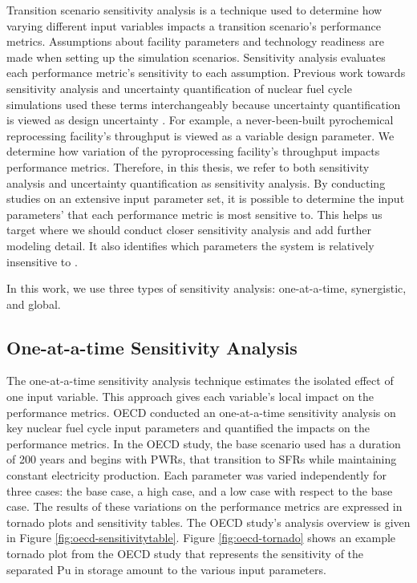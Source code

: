 Transition scenario sensitivity analysis is a technique used to determine how varying
different input variables impacts a transition scenario's performance metrics.
Assumptions about facility parameters and technology readiness 
are made when setting up the simulation scenarios. 
Sensitivity analysis evaluates each performance metric's 
sensitivity to each assumption. 
Previous work towards sensitivity analysis and uncertainty quantification of 
nuclear fuel cycle simulations used these terms interchangeably
because uncertainty quantification is viewed as design uncertainty \cite{noauthor_effects_2017}.
For example, a never-been-built pyrochemical reprocessing 
facility's throughput is viewed as a variable design parameter.
We determine how variation of the pyroprocessing 
facility's throughput impacts performance metrics.
Therefore, in this thesis, we refer to both sensitivity analysis 
and uncertainty quantification as sensitivity analysis. 
By conducting studies on an extensive input parameter set, 
it is possible to determine the input parameters' that each performance 
metric is most sensitive to.
This helps us target where we should conduct closer 
sensitivity analysis and add further modeling detail.
It also identifies which parameters the system is relatively 
insensitive to \cite{noauthor_effects_2017}. 

In this work, we use three types of sensitivity analysis: 
one-at-a-time, synergistic, and global.

\subsection{One-at-a-time Sensitivity Analysis}
The one-at-a-time sensitivity analysis technique estimates 
the isolated effect of one input variable. 
This approach gives each variable's local impact 
on the performance metrics. 
\gls{OECD} conducted an one-at-a-time sensitivity analysis \cite{noauthor_effects_2017} 
on key nuclear fuel cycle input parameters
and quantified the impacts on the performance metrics. 
In the OECD study, the base scenario used has a duration of 200 years and begins 
with \glspl{PWR}, that transition to \glspl{SFR} while 
maintaining constant electricity production. 
Each parameter was varied independently for three cases: 
the base case, a high case, and a low case with respect to the base case. 
The results of these variations on the performance metrics 
are expressed in tornado plots and sensitivity tables. 
The OECD study's analysis overview is given in Figure \ref{fig:oecd-sensitivitytable}. 
Figure \ref{fig:oecd-tornado} shows an example tornado plot 
from the OECD study that represents 
the sensitivity of the separated Pu in storage amount to the 
various input parameters. 

